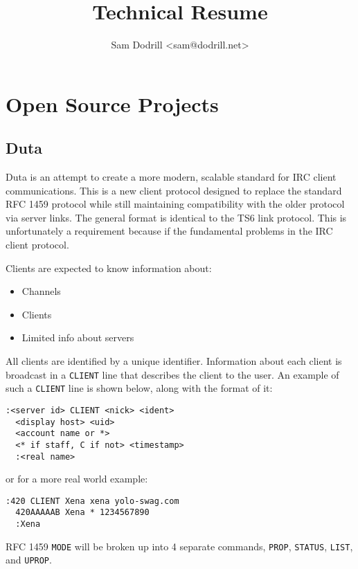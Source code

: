 \documentclass[twocolumn]{article}
\title{Technical Resume}
\author{Sam Dodrill \textless{}sam@dodrill.net\textgreater{}}
\date{}
\begin{document}
\twocolumn[
 \begin{@twocolumnfalse}
  \maketitle
   \end{@twocolumnfalse}
]

\section{Open Source Projects}

\subsection{Duta}

Duta is an attempt to create a more modern, scalable standard for IRC client communications.  This is a new client protocol designed to replace the standard RFC 1459 protocol while still maintaining compatibility with the older protocol via server links. The general format is identical to the TS6 link protocol. This is unfortunately a requirement because if the fundamental problems in the IRC client protocol.

Clients are expected to know information about:

\begin{itemize}
	\item Channels
	\item Clients
	\item Limited info about servers
\end{itemize}

All clients are identified by a unique identifier. Information about each client is broadcast in a \texttt{CLIENT} line that describes the client to the user. An example of such a \texttt{CLIENT} line is shown below, along with the format of it:

\begin{verbatim}
:<server id> CLIENT <nick> <ident>
  <display host> <uid>
  <account name or *> 
  <* if staff, C if not> <timestamp> 
  :<real name>
\end{verbatim}

or for a more real world example:

\begin{verbatim}
:420 CLIENT Xena xena yolo-swag.com
  420AAAAAB Xena * 1234567890
  :Xena
\end{verbatim}

RFC 1459 \texttt{MODE} will be broken up into 4 separate commands, \texttt{PROP}, \texttt{STATUS}, \texttt{LIST}, and \texttt{UPROP}.
\end{document}
